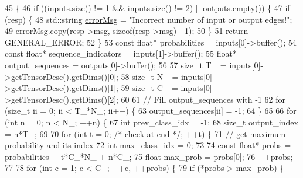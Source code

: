 \begin{DoxyCode}
45                                                              \{
46         \textcolor{keywordflow}{if} ((inputs.size() != 1 && inputs.size() != 2) || outputs.empty()) \{
47             \textcolor{keywordflow}{if} (resp) \{
48                 std::string \hyperlink{classInferenceEngine_1_1Extensions_1_1Cpu_1_1ExtLayerBase_abc78e9b5a79fa339ffd831a5318f71f7}{errorMsg} = \textcolor{stringliteral}{"Incorrect number of input or output edges!"};
49                 errorMsg.copy(resp->msg, \textcolor{keyword}{sizeof}(resp->msg) - 1);
50             \}
51             \textcolor{keywordflow}{return} GENERAL\_ERROR;
52         \}
53         \textcolor{keyword}{const} \textcolor{keywordtype}{float}* probabilities = inputs[0]->buffer();
54         \textcolor{keyword}{const} \textcolor{keywordtype}{float}* sequence\_indicators = inputs[1]->buffer();
55         \textcolor{keywordtype}{float}* output\_sequences = outputs[0]->buffer();
56 
57         \textcolor{keywordtype}{size\_t} T\_ = inputs[0]->getTensorDesc().getDims()[0];
58         \textcolor{keywordtype}{size\_t} N\_ = inputs[0]->getTensorDesc().getDims()[1];
59         \textcolor{keywordtype}{size\_t} C\_ = inputs[0]->getTensorDesc().getDims()[2];
60 
61         \textcolor{comment}{// Fill output\_sequences with -1}
62         \textcolor{keywordflow}{for} (\textcolor{keywordtype}{size\_t} ii = 0; ii < T\_*N\_; ii++) \{
63             output\_sequences[ii] = -1;
64         \}
65 
66         \textcolor{keywordflow}{for} (\textcolor{keywordtype}{int} n = 0; n < N\_; ++n) \{
67             \textcolor{keywordtype}{int} prev\_class\_idx = -1;
68             \textcolor{keywordtype}{size\_t} output\_index = n*T\_;
69 
70             \textcolor{keywordflow}{for} (\textcolor{keywordtype}{int} t = 0; \textcolor{comment}{/* check at end */}; ++t) \{
71                 \textcolor{comment}{// get maximum probability and its index}
72                 \textcolor{keywordtype}{int} max\_class\_idx = 0;
73 
74                 \textcolor{keyword}{const} \textcolor{keywordtype}{float}* probs = probabilities + t*C\_*N\_ + n*C\_;
75                 \textcolor{keywordtype}{float} max\_prob = probs[0];
76                 ++probs;
77 
78                 \textcolor{keywordflow}{for} (\textcolor{keywordtype}{int} \hyperlink{CMakeCache_8txt_aac1d6a1710812201527c735f7c6afbaa}{c} = 1; \hyperlink{CMakeCache_8txt_aac1d6a1710812201527c735f7c6afbaa}{c} < C\_; ++\hyperlink{CMakeCache_8txt_aac1d6a1710812201527c735f7c6afbaa}{c}, ++probs) \{
79                     \textcolor{keywordflow}{if} (*probs > max\_prob) \{

\end{DoxyCode}
